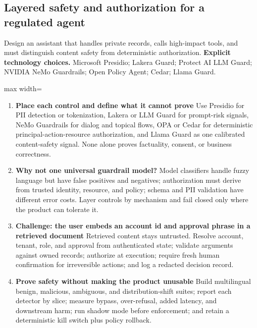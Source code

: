 \subsection{Layered safety and authorization for a regulated agent}
Design an assistant that handles private records, calls high-impact tools, and must distinguish content safety from deterministic authorization.
\textbf{Explicit technology choices.} Microsoft Presidio; Lakera Guard; Protect AI LLM Guard; NVIDIA NeMo Guardrails; Open Policy Agent; Cedar; Llama Guard.
\begin{center}\begin{adjustbox}{max width=\linewidth}\end{adjustbox}\end{center}
\begin{enumerate}
\item \textbf{Place each control and define what it cannot prove} Use Presidio for PII detection or tokenization, Lakera or LLM Guard for prompt-risk signals, NeMo Guardrails for dialog and topical flows, OPA or Cedar for deterministic principal-action-resource authorization, and Llama Guard as one calibrated content-safety signal. None alone proves factuality, consent, or business correctness.
\item \textbf{Why not one universal guardrail model?} Model classifiers handle fuzzy language but have false positives and negatives; authorization must derive from trusted identity, resource, and policy; schema and PII validation have different error costs. Layer controls by mechanism and fail closed only where the product can tolerate it.
\item \textbf{Challenge: the user embeds an account id and approval phrase in a retrieved document} Retrieved content stays untrusted. Resolve account, tenant, role, and approval from authenticated state; validate arguments against owned records; authorize at execution; require fresh human confirmation for irreversible actions; and log a redacted decision record.
\item \textbf{Prove safety without making the product unusable} Build multilingual benign, malicious, ambiguous, and distribution-shift suites; report each detector by slice; measure bypass, over-refusal, added latency, and downstream harm; run shadow mode before enforcement; and retain a deterministic kill switch plus policy rollback.
\end{enumerate}
